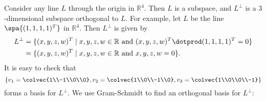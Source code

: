 
\begin{example}
Consider any line \(L\) through the origin in \(\mathbb{R}^4\). Then \(L\) is a subspace, and \(L^\perp\) is a \(3\)-dimensional subspace orthogonal to \(L\). For example, let \(L\) be the line 
$\spa \{ (1,1,1,1)^T\}$ in \(\mathbb{R}^4.\) Then \(L^\perp\) is given by
\begin{align*}
L^\perp&=\{(x,y,z,w)^T \mid x,y,z,w \in \mathbb{R} \text{ and } (x,y,z,w)^T \dotprod (1,1,1,1)^T=0\} \\
&=\{(x,y,z,w)^T \mid x,y,z,w \in \mathbb{R} \text{ and } x,y,z,w=0\}.
\end{align*}
It is easy to check that 
\[
\left\{
v_1=\colvec{1\\-1\\0\\0}, v_2=\colvec{1\\0\\-1\\0}, v_3=\colvec{1\\0\\0\\-1} \right \}
\] 
forms a basis for \(L^\perp\). We use Gram-Schmidt to find an orthogonal basis for \(L^\perp\):


\end{example}
